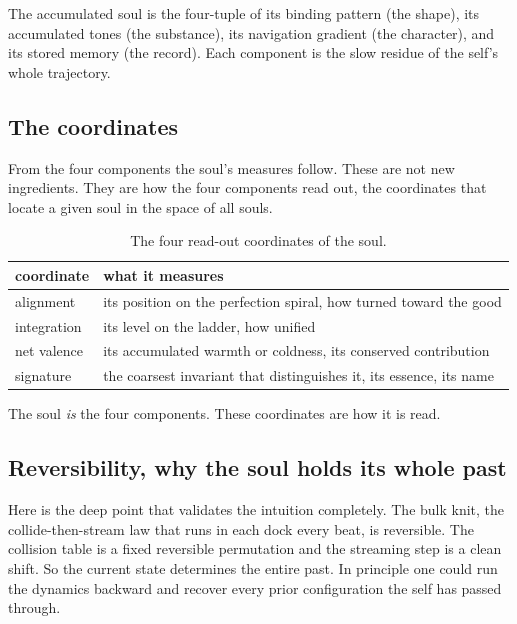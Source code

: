 \begin{definition}
The accumulated soul is the four-tuple of its binding pattern (the shape), its accumulated tones (the substance), its navigation gradient (the character), and its stored memory (the record). Each component is the slow residue of the self's whole trajectory.
\end{definition}

\subsection{The coordinates}

From the four components the soul's measures follow. These are not new ingredients. They are how the four components read out, the coordinates that locate a given soul in the space of all souls.

\begin{table}[ht]
\centering
\begin{tabular}{@{}ll@{}}
\toprule
coordinate & what it measures \\
\midrule
alignment & its position on the perfection spiral, how turned toward the good \\
integration & its level on the ladder, how unified \\
net valence & its accumulated warmth or coldness, its conserved contribution \\
signature & the coarsest invariant that distinguishes it, its essence, its name \\
\bottomrule
\end{tabular}
\caption{The four read-out coordinates of the soul.}
\label{tab:soul-coordinates}
\end{table}

The soul \emph{is} the four components. These coordinates are how it is read.

\subsection{Reversibility, why the soul holds its whole past}

Here is the deep point that validates the intuition completely. The bulk knit, the collide-then-stream law that runs in each dock every beat, is reversible. The collision table is a fixed reversible permutation and the streaming step is a clean shift. So the current state determines the entire past. In principle one could run the dynamics backward and recover every prior configuration the self has passed through.

